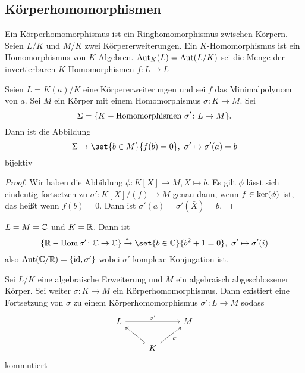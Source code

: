 \subsection{Körperhomomorphismen}
\begin{Def}
    Ein Körperhomomorphismus ist ein Ringhomomorphismus zwischen Körpern. Seien \(L/K\) und \(M/K\) zwei Körpererweiterungen. Ein \(K\)-Homomorphismus ist ein Homomorphismus von \(K\)-Algebren.
    \(\operatorname{Aut}_K(L)=\operatorname{Aut}(L/K)\) sei die Menge der invertierbaren \(K\)-Homomorphismen \(f\colon L\to L\)
\end{Def}
\begin{Lemma}
 Seien \(L=K(a)/K\) eine Körpererweiterungen und sei \(f\) das Minimalpolynom von \(a\). Sei \(M\) ein Körper mit einem Homomorphismus \(\sigma\colon K\to M\). Sei \[\Sigma=\{K-\text{Homomorphismen } \sigma'\colon L\to M\}.\] Dann ist die Abbildung 
    \[\Sigma\to\set{b\in M}{ f(b)=0},\ \sigma'\mapsto \sigma'(a)=b\] bijektiv
\end{Lemma}
\begin{proof}
    Wir haben die Abbildung \(\phi\colon K[X]\to M, X\mapsto b\). Es gilt \(\phi\) lässt sich eindeutig fortsetzen zu \(\sigma'\colon K[X]/(f)\to M\) genau dann, wenn \(f\in \operatorname{ker}(\phi)\) ist, das heißt wenn \(f(b)=0\). Dann ist \(\sigma'(a)=\sigma'(\bar X)=b\).
\end{proof}
\begin{Bsp}
    \(L=M=\mathbb{C}\) und \(K=\mathbb{R}\). Dann ist
    \[\{\RR-\Hom \sigma'\colon\CC\to\CC\} \stackrel{\sim}{\to}\set{b\in\CC}{b^2+1=0},\ \sigma'\mapsto \sigma'(i)\]
    also \(\operatorname{Aut}(\mathbb{C}/\mathbb{R})=\{\mathrm{id},\sigma'\}\) wobei \(\sigma'\) komplexe Konjugation ist.
\end{Bsp}
\begin{Satz}\label{Satz:AlgAbMor}
    Sei \(L/K\) eine algebraische Erweiterung und \(M\) ein algebraisch abgeschlossener Körper. Sei weiter \(\sigma\colon K\to M\) ein Körperhomomorphismus. Dann existiert eine Fortsetzung von \(\sigma\) zu einem Körperhomomorphismus \(\sigma'\colon L\to M\) sodass $$%
\begin{tikzcd}
L \arrow[rr, "\sigma'"] &                                          & M \\
                        & K \arrow[ru, "\sigma"'] \arrow[lu, hook] &  
\end{tikzcd}$$ kommutiert
\end{Satz}
